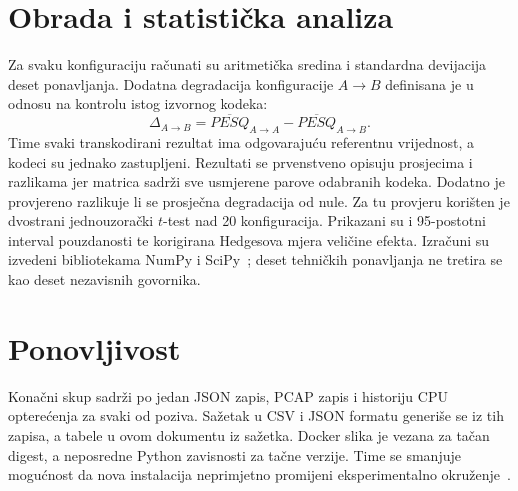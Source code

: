 \section{Obrada i statistička analiza}

Za svaku konfiguraciju računati su aritmetička sredina i standardna devijacija deset ponavljanja. Dodatna degradacija konfiguracije $A\rightarrow B$ definisana je u odnosu na kontrolu istog izvornog kodeka:
\begin{equation}
\Delta_{A\rightarrow B}=\overline{PESQ}_{A\rightarrow A}-\overline{PESQ}_{A\rightarrow B}.
\end{equation}
Time svaki transkodirani rezultat ima odgovarajuću referentnu vrijednost, a kodeci su jednako zastupljeni. Rezultati se prvenstveno opisuju prosjecima i razlikama jer matrica sadrži sve usmjerene parove odabranih kodeka. Dodatno je provjereno razlikuje li se prosječna degradacija od nule. Za tu provjeru korišten je dvostrani jednouzorački $t$-test nad 20 konfiguracija. Prikazani su i 95-postotni interval pouzdanosti te korigirana Hedgesova mjera veličine efekta. Izračuni su izvedeni bibliotekama NumPy i SciPy~\cite{scipy}; deset tehničkih ponavljanja ne tretira se kao deset nezavisnih govornika.

\section{Ponovljivost}

Konačni skup sadrži po jedan JSON zapis, PCAP zapis i historiju CPU opterećenja za svaki od \BrojPoziva{} poziva. Sažetak u CSV i JSON formatu generiše se iz tih zapisa, a tabele u ovom dokumentu iz sažetka. Docker slika je vezana za tačan digest, a neposredne Python zavisnosti za tačne verzije. Time se smanjuje mogućnost da nova instalacija neprimjetno promijeni eksperimentalno okruženje~\cite{docker-handbook,pjsip}.
